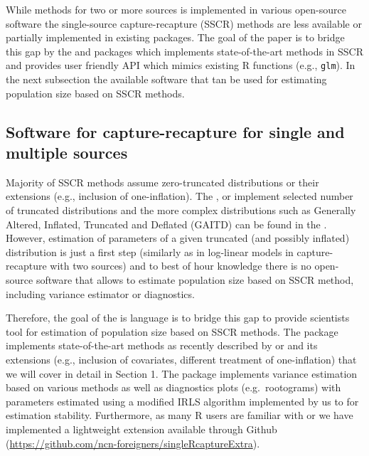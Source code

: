 \documentclass[
]{jss}
\newcommand{\1}{\mathcal{I}} \newcommand{\bZero}{\boldsymbol{0}}
\begin{document}
While methods for two or more sources is implemented in various
open-source software \citep[e.g.,][]{baillargeon2007rcapture} the
single-source capture-recapture (SSCR) methods are less available or
partially implemented in existing packages. The goal of the paper is to
bridge this gap by the  and
 packages which implements state-of-the-art
methods in SSCR and provides user friendly API which mimics existing R
functions (e.g., \texttt{glm}). In the next subsection the available
software that tan be used for estimating population size based on SSCR
methods.

\subsection{Software for capture-recapture for single and multiple
sources}\label{software-for-capture-recapture-for-single-and-multiple-sources}

Majority of SSCR methods assume zero-truncated distributions or their
extensions (e.g., inclusion of one-inflation). The 
\citep{countreg},  \citep{VGAM-main} or 
\citep{distributions3} implement selected number of truncated
distributions and the more complex distributions such as Generally
Altered, Inflated, Truncated and Deflated (GAITD) can be found in the
. However, estimation of parameters of a given truncated (and
possibly inflated) distribution is just a first step (similarly as in
log-linear models in capture-recapture with two sources) and to best of
hour knowledge there is no open-source software that allows to estimate
population size based on SSCR method, including variance estimator or
diagnostics.

Therefore, the goal of the  is  language
is to bridge this gap to provide scientists tool for estimation of
population size based on SSCR methods. The package implements
state-of-the-art methods as recently described by
\citet{bohning2018capture} or \citet{bohning2024one} and its extensions
(e.g., inclusion of covariates, different treatment of one-inflation)
that we will cover in detail in Section 1. The package implements
variance estimation based on various methods as well as diagnostics
plots (e.g.~rootograms) with parameters estimated using a modified IRLS
algorithm implemented by us to for estimation stability. Furthermore, as
many R users are familiar with  or  we have
implemented a lightweight extension  available
through Github
(\url{https://github.com/ncn-foreigners/singleRcaptureExtra}).
\end{document}
